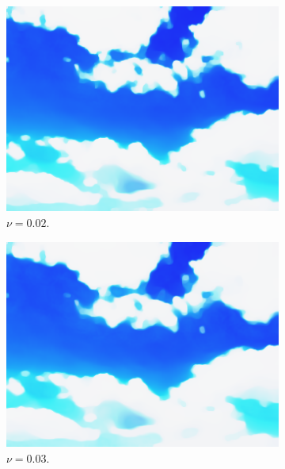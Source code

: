 \documentclass[abstracton]{scrreprt}
\begin{document}
            \begin{figure}[!ht]
                \centering
                \begin{subfigure}[b]{0.16\textwidth}
                    \includegraphics[width=\textwidth]{img/segmentation/cr/002blue.png}
                    \caption{$\nu = 0.02$.}
                \end{subfigure}
                \begin{subfigure}[b]{0.16\textwidth}
                    \includegraphics[width=\textwidth]{img/segmentation/cr/003blue.png}
                    \caption{$\nu = 0.03$.}
                \end{subfigure}
                \begin{subfigure}[b]{0.16\textwidth}

\end{subfigure}
\end{figure}
\end{document}
